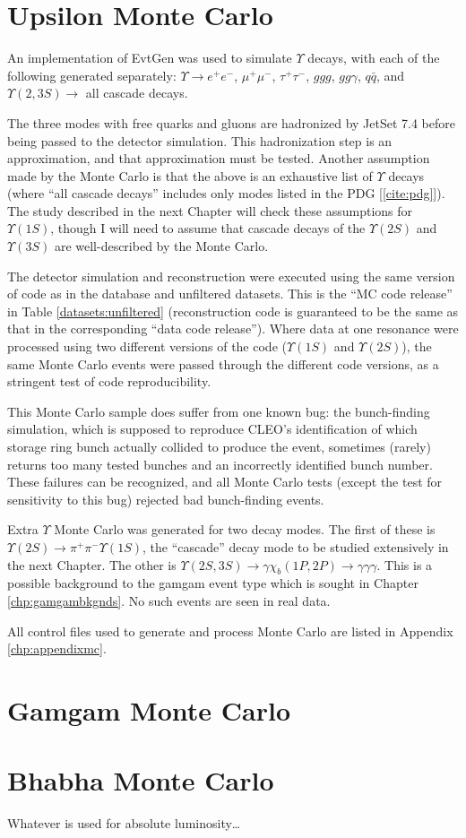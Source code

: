 \section{Upsilon Monte Carlo}

An implementation of EvtGen was used to simulate $\Upsilon$ decays,
with each of the following generated separately: $\Upsilon \to
e^+e^-$, $\mu^+\mu^-$, $\tau^+\tau^-$, $ggg$, $gg\gamma$, $q\bar{q}$,
and $\Upsilon(2,3S) \to$ all cascade decays.

The three modes with free quarks and gluons are hadronized by JetSet
7.4 before being passed to the detector simulation.  This
hadronization step is an approximation, and that approximation must be
tested.  Another assumption made by the Monte Carlo is that the above
is an exhaustive list of $\Upsilon$ decays (where ``all cascade
decays'' includes only modes listed in the PDG [\ref{cite:pdg}]).  The
study described in the next Chapter will check these assumptions for
$\Upsilon(1S)$, though I will need to assume that cascade decays of
the $\Upsilon(2S)$ and $\Upsilon(3S)$ are well-described by the Monte
Carlo.

The detector simulation and reconstruction were executed using the
same version of code as in the database and unfiltered datasets.  This
is the ``MC code release'' in Table \ref{datasets:unfiltered}
(reconstruction code is guaranteed to be the same as that in the
corresponding ``data code release'').  Where data at one resonance
were processed using two different versions of the code
($\Upsilon(1S)$ and $\Upsilon(2S)$), the same Monte Carlo events were
passed through the different code versions, as a stringent test of
code reproducibility.

This Monte Carlo sample does suffer from one known bug: the
bunch-finding simulation, which is supposed to reproduce CLEO's
identification of which storage ring bunch actually collided to
produce the event, sometimes (rarely) returns too many tested bunches
and an incorrectly identified bunch number.  These failures can be
recognized, and all Monte Carlo tests (except the test for sensitivity
to this bug) rejected bad bunch-finding events.

Extra $\Upsilon$ Monte Carlo was generated for two decay modes.  The
first of these is $\Upsilon(2S) \to \pi^+\pi^- \Upsilon(1S)$, the
``cascade'' decay mode to be studied extensively in the next Chapter.
The other is $\Upsilon(2S,3S) \to \gamma \chi_b(1P,2P) \to \gamma
\gamma \gamma$.  This is a possible background to the gamgam event
type which is sought in Chapter \ref{chp:gamgambkgnds}.  No such
events are seen in real data.

All control files used to generate and process Monte Carlo are listed
in Appendix \ref{chp:appendixmc}.

\section{Gamgam Monte Carlo}

\section{Bhabha Monte Carlo}

Whatever is used for absolute luminosity\ldots


